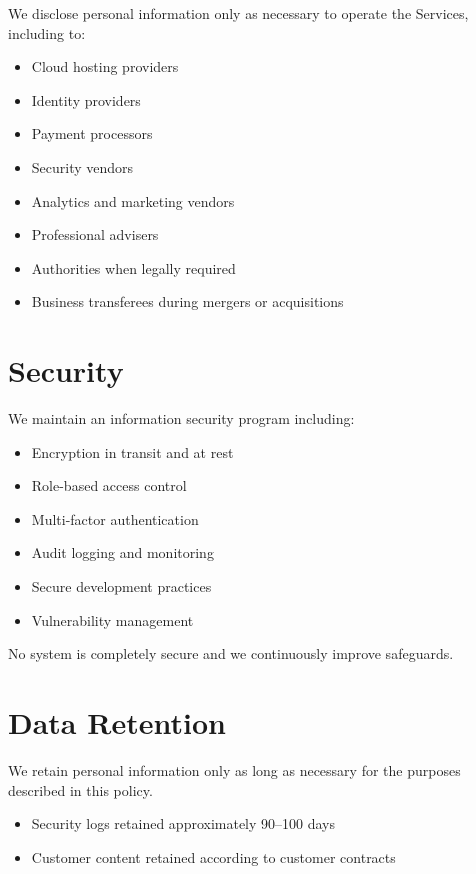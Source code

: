 \documentclass[11pt]{article}
\begin{document}
We disclose personal information only as necessary to operate the Services, including to:

\begin{itemize}
\item Cloud hosting providers
\item Identity providers
\item Payment processors
\item Security vendors
\item Analytics and marketing vendors
\item Professional advisers
\item Authorities when legally required
\item Business transferees during mergers or acquisitions
\end{itemize}

\section{Security}

We maintain an information security program including:

\begin{itemize}
\item Encryption in transit and at rest
\item Role-based access control
\item Multi-factor authentication
\item Audit logging and monitoring
\item Secure development practices
\item Vulnerability management
\end{itemize}

No system is completely secure and we continuously improve safeguards.

\section{Data Retention}

We retain personal information only as long as necessary for the purposes described in this policy.

\begin{itemize}
\item Security logs retained approximately 90--100 days
\item Customer content retained according to customer contracts
\end{itemize}
\end{document}
